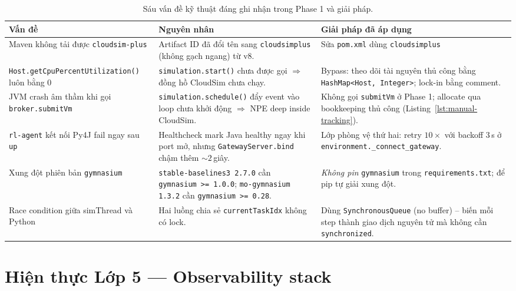 \begin{table}[H]
  \centering
  \caption{Sáu vấn đề kỹ thuật đáng ghi nhận trong Phase 1 và giải pháp.}
  \label{tab:issues}
  \footnotesize
  \begin{tabularx}{\linewidth}{l X X}
    \toprule
    \textbf{Vấn đề} & \textbf{Nguyên nhân} & \textbf{Giải pháp đã áp dụng} \\
    \midrule
    Maven không tải được \texttt{cloudsim-plus}
      & Artifact ID đã đổi tên sang \texttt{cloudsimplus} (không gạch ngang) từ v8.
      & Sửa \texttt{pom.xml} dùng \texttt{cloudsimplus}\\
    \texttt{Host.getCpuPercentUtilization()} luôn bằng $0$
      & \texttt{simulation.start()} chưa được gọi $\Rightarrow$
        đồng hồ CloudSim chưa chạy.
      & Bypass: theo dõi tài nguyên thủ công bằng
        \texttt{HashMap<Host, Integer>}; lock-in bằng comment. \\
    JVM crash âm thầm khi gọi \texttt{broker.submitVm}
      & \texttt{simulation.schedule()} đẩy event vào loop chưa khởi động
        $\Rightarrow$ NPE deep inside CloudSim.
      & Không gọi \texttt{submitVm} ở Phase 1; allocate qua bookkeeping
        thủ công (Listing~\ref{lst:manual-tracking}). \\
    \texttt{rl-agent} kết nối Py4J fail ngay sau \texttt{up}
      & Healthcheck mark Java healthy ngay khi port mở, nhưng
        \texttt{GatewayServer.bind} chậm thêm $\sim 2$\,giây.
      & Lớp phòng vệ thứ hai: retry $10\times$ với backoff $3$\,s ở
        \texttt{environment.\_connect\_gateway}. \\
    Xung đột phiên bản \texttt{gymnasium}
      & \texttt{stable-baselines3 2.7.0} cần
        \texttt{gymnasium\,>=\,1.0.0}; \texttt{mo-gymnasium 1.3.2} cần
        \texttt{gymnasium\,>=\,0.28}.
      & \emph{Không pin} \texttt{gymnasium} trong
        \texttt{requirements.txt}; để pip tự giải xung đột. \\
    Race condition giữa simThread và Python
      & Hai luồng chia sẻ \texttt{currentTaskIdx} không có lock.
      & Dùng \texttt{SynchronousQueue} (no buffer) -- biến mỗi step
        thành giao dịch nguyên tử mà không cần \texttt{synchronized}. \\
    \bottomrule
  \end{tabularx}
\end{table}

\section{Hiện thực Lớp 5 — Observability stack}
\label{sec:impl-monitoring}

